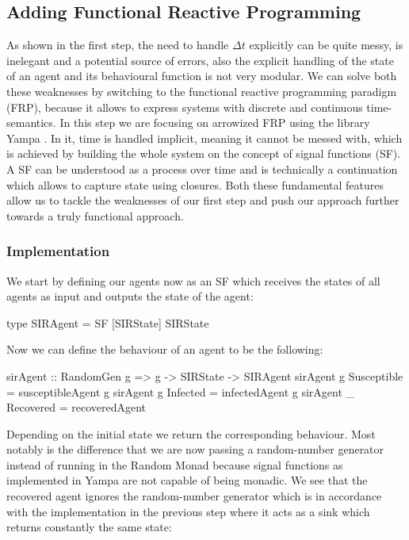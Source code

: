 \subsection{Adding Functional Reactive Programming}
\label{sec:step2_frp}
As shown in the first step, the need to handle $\Delta t$ explicitly can be quite messy, is inelegant and a potential source of errors, also the explicit handling of the state of an agent and its behavioural function is not very modular. We can solve both these weaknesses by switching to the functional reactive programming paradigm (FRP), because it allows to express systems with discrete and continuous time-semantics. In this step we are focusing on arrowized \cite{hughes_generalising_2000} FRP using the library Yampa \cite{hudak_arrows_2003}. In it, time is handled implicit, meaning it cannot be messed with, which is achieved by building the  whole system on the concept of signal functions (SF). A SF can be understood as a process over time and is technically a continuation which allows to capture state using closures. Both these fundamental features allow us to tackle the weaknesses of our first step and push our approach further towards a truly functional approach.

\subsubsection{Implementation}
We start by defining our agents now as an SF which receives the states of all agents as input and outputs the state of the agent:

\begin{HaskellCode}
type SIRAgent = SF [SIRState] SIRState 
\end{HaskellCode}

Now we can define the behaviour of an agent to be the following:

\begin{HaskellCode}
sirAgent :: RandomGen g => g -> SIRState -> SIRAgent
sirAgent g Susceptible = susceptibleAgent g
sirAgent g Infected    = infectedAgent g
sirAgent _ Recovered   = recoveredAgent
\end{HaskellCode}

Depending on the initial state we return the corresponding behaviour. Most notably is the difference that we are now passing a random-number generator instead of running in the Random Monad because signal functions as implemented in Yampa are not capable of being monadic. We see that the recovered agent ignores the random-number generator which is in accordance with the implementation in the previous step where it acts as a sink which returns constantly the same state:

